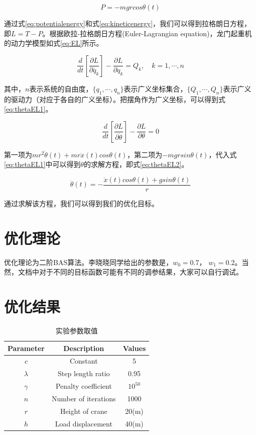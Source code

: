 \documentclass[]{ctexbook}
\begin{document}
\begin{equation}
P = -mgrcos\theta(t)
\label{eq:potentialenergy}
\end{equation}

通过式\eqref{eq:potentialenergy}和式\eqref{eq:kineticenergy}，我们可以得到拉格朗日方程，即\(L = T -P\)。根据欧拉-拉格朗日方程(Euler-Lagrangian
equation)，龙门起重机的动力学模型如式\eqref{eq:EL}所示。

\begin{equation}
\frac{d}{dt}[\frac{\partial{L}}{\partial{\dot{q_k}}}] - \frac{\partial{L}}{\partial{q_k}}=Q_k, \quad k=1,\cdots,n
\label{eq:EL}
\end{equation}

其中，\(n\)表示系统的自由度，\(\{q_1,\cdots,q_n\}\)表示广义坐标集合，\(\{Q_1,\cdots,Q_n\}\)表示广义的驱动力（对应于各自的广义坐标）。把摆角作为广义坐标，可以得到式\eqref{eq:thetaEL1}。

\begin{equation}
\frac{d}{dt}[\frac{\partial{L}}{\partial{\dot{\theta}}}] - \frac{\partial{L}}{\partial{\theta}}=0
\label{eq:thetaEL1}
\end{equation}

第一项为\(mr^2\ddot{\theta}(t)+mr\ddot{x}(t)cos\theta(t)\)，第二项为\(-mgrsin\theta(t)\)，代入式\eqref{eq:thetaEL1}中可以得到\(\theta\)的求解方程，即式\eqref{eq:thetaEL2}。

\begin{equation}
\ddot{\theta}(t)=-\frac{\ddot{x}(t)cos\theta(t)+gsin\theta(t)}{r}
\label{eq:thetaEL2}
\end{equation}

通过求解该方程，我们可以得到我们的优化目标。

\section{优化理论}\label{-1}

优化理论为二阶BAS算法。李晓晓同学给出的参数是，\(w_0 = 0.7\)，
\(w_1 = 0.2\)。当然，文档中对于不同的目标函数可能有不同的调参结果，大家可以自行调试。

\section{优化结果}\label{-1}

\begin{table}[t]

\caption{\label{tab:example2parms}实验参数取值}
\centering
\begin{tabular}{ccc}
\toprule
Parameter & Description & Values\\
\midrule
$c$ & Constant & 5\\
$\lambda$ & Step length ratio & 0.95\\
$\gamma$ & Penalty coefficient & $10^{50}$\\
$n$ & Number of iterations & 1000\\
$r$ & Height of crane & 20(m)\\
\addlinespace
$h$ & Load displacement & 40(m)\\
\bottomrule
\end{tabular}
\end{table}
\end{document}
